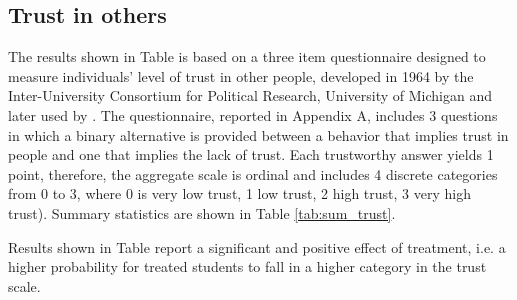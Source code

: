 \documentclass[ 12 pt]{article}
\begin{document}
\subsection{Trust in others}
The results shown in Table \label{tab:trust} is based on a three item questionnaire designed to measure individuals’ level of trust in other people, developed in 1964 by the Inter-University Consortium for Political Research, University of Michigan and later used by \cite{yamagishi1986provision,hetherington1998political,levi2000political}. The questionnaire, reported in Appendix A, includes 3 questions in which a binary alternative is provided between a behavior that implies trust in people and one that implies the lack of trust. Each trustworthy answer yields 1 point, therefore, the aggregate scale is ordinal and includes 4 discrete categories from 0 to 3, where 0 is very low trust, 1 low trust, 2 high trust, 3 very high trust). Summary statistics are shown in Table \ref{tab:sum_trust}.



Results shown in Table \label{tab:trust} report a significant and positive effect of treatment, i.e. a higher probability for treated students to fall in a higher category in the trust scale.


\end{document}
